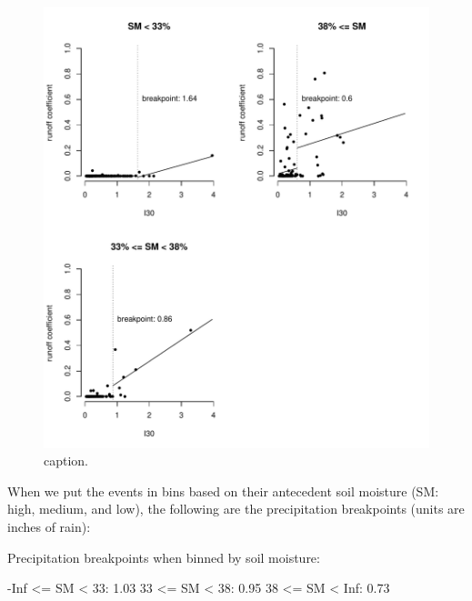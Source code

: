 \documentclass[12pt]{article}
\begin{document}
\begin{figure}
    \begin{center}
\includegraphics{runoff-I30_binned}
    \end{center}
    \caption{caption.\label{I30_binned}}
\end{figure}


When we put the events in bins based on their antecedent soil moisture (SM: high, medium, and low), the following are the precipitation breakpoints (units are inches of rain):\\

\begin{Schunk}
\begin{Soutput}
Precipitation breakpoints when binned by soil moisture:
\end{Soutput}
\begin{Soutput}
-Inf <= SM < 33: 1.03
33 <= SM < 38: 0.95
38 <= SM < Inf: 0.73
\end{Soutput}
\end{Schunk}
\end{document}

